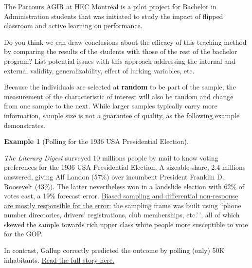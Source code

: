 \documentclass[
  11pt,
  letterpaper,
]{scrbook}
\theoremstyle{definition}
\theoremstyle{definition}
\newtheorem{example}{Example}[chapter]
\theoremstyle{remark}
\begin{document}
\begin{tcolorbox}[enhanced jigsaw, left=2mm, leftrule=.75mm, coltitle=black, breakable, bottomrule=.15mm, colframe=quarto-callout-tip-color-frame, titlerule=0mm, colbacktitle=quarto-callout-tip-color!10!white, rightrule=.15mm, toprule=.15mm, title=\textcolor{quarto-callout-tip-color}{\faLightbulb}\hspace{0.5em}{Your turn}, opacityback=0, toptitle=1mm, bottomtitle=1mm, arc=.35mm, opacitybacktitle=0.6, colback=white]

The
\href{https://www.hec.ca/programmes/baccalaureats/parcours-agir/index.html}{Parcours
AGIR} at HEC Montréal is a pilot project for Bachelor in Administration
students that was initiated to study the impact of flipped classroom and
active learning on performance.

Do you think we can draw conclusions about the efficacy of this teaching
method by comparing the results of the students with those of the rest
of the bachelor program? List potential issues with this approach
addressing the internal and external validity, generalizability, effect
of lurking variables, etc.

\end{tcolorbox}

Because the individuals are selected at \textbf{random} to be part of
the sample, the measurement of the characteristic of interest will also
be random and change from one sample to the next. While larger samples
typically carry more information, sample size is not a guarantee of
quality, as the following example demonstrates.

\begin{example}[Polling for the 1936 USA Presidential
Election]\protect\hypertarget{exm-Galluppoll}{}\label{exm-Galluppoll}

\emph{The Literary Digest} surveyed 10 millions people by mail to know
voting preferences for the 1936 USA Presidential Election. A sizeable
share, 2.4 millions answered, giving Alf Landon (57\%) over incumbent
President Franklin D. Roosevelt (43\%). The latter nevertheless won in a
landslide election with 62\% of votes cast, a 19\% forecast error.
\href{https://www.jstor.org/stable/2749114}{Biased sampling and
differential non-response are mostly responsible for the error:} the
sampling frame was built using ``phone number directories, drivers'
registrations, club memberships, etc.'\,', all of which skewed the
sample towards rich upper class white people more susceptible to vote
for the GOP.

In contrast, Gallup correctly predicted the outcome by polling (only)
50K inhabitants.
\href{https://medium.com/@ozanozbey/how-not-to-sample-11579793dac}{Read
the full story here.}

\end{example}
\end{document}

